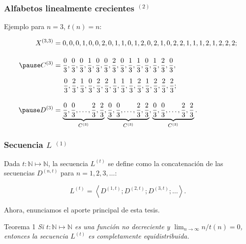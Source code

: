 \documentclass[t, 10pt, mathserif]{beamer}
\begin{document}
\begin{frame}
  \frametitle{Alfabetos linealmente crecientes {$^{(2)}$}}

  Ejemplo para $n = 3$, $t(n) = n$:
  \pause

  \begin{equation*}
    \begin{aligned}
      X^{(3, 3)} & = 0, 0, 0, 1, 0, 0, 2, 0, 1, 1, 0, 1, 2, 0, 2, 1, 0, 2, 2, 1, 1, 1, 2, 1, 2, 2, 2  \text{;} \\[0.4cm] \pause
      C^{(3)}    & = \frac{0}{3}, \frac{0}{3}, \frac{0}{3}, \frac{1}{3}, \frac{0}{3}, \frac{0}{3}, \frac{2}{3}, \frac{0}{3}, \frac{1}{3}, \frac{1}{3}, \frac{0}{3}, \frac{1}{3}, \frac{2}{3}, \frac{0}{3}, \\[0.2cm]
                 & \hspace{0.5cm} \frac{0}{3}, \frac{2}{3}, \frac{1}{3}, \frac{0}{3}, \frac{2}{3}, \frac{2}{3}, \frac{1}{3}, \frac{1}{3}, \frac{1}{3}, \frac{2}{3}, \frac{1}{3}, \frac{2}{3}, \frac{2}{3}, \frac{2}{3} \text{;} \\[0.4cm] \pause
      D^{(3)}   & = \underbrace{\frac{0}{3}, \frac{0}{3}, \dots, \frac{2}{3}, \frac{2}{3}}_{C^{(3)}}, \underbrace{\frac{0}{3}, \frac{0}{3}, \dots, \frac{2}{3}, \frac{2}{3}}_{C^{(3)}}, \underbrace{\frac{0}{3}, \frac{0}{3}, \dots, \frac{2}{3}, \frac{2}{3}}_{C^{(3)}} \text{.}
    \end{aligned}
  \end{equation*}
\end{frame}


\begin{frame}
  \frametitle{Secuencia $L$ {$^{(1)}$}}

  \begin{definition}
    \medskip
    Dada $t : \mathbb{N} \mapsto \mathbb{N}$, la secuencia $L^{(t)}$ se define como la concatenación de las secuencias $D^{(n, t)}$ para $n = 1, 2, 3, \dots$:
    \pause

    \begin{equation*}
      L^{(t)} = \left< D^{(1, t)} ; D^{(2, t)} ;  D^{(3, t)} ; \dots \right> \text{.}
    \end{equation*}
  \end{definition}
  \pause

  {\color{cyan} Ahora, enunciamos el aporte principal de esta tesis.}
  \pause

  \medskip
  \begin{block}{Teorema 1}
    \medskip
    \textit{Si $t : \mathbb{N} \mapsto \mathbb{N}$ es una función no decreciente y $\lim_{n \to \infty} n / t(n) = 0$, entonces la secuencia $L^{(t)}$ es completamente equidistribuida.}
  \end{block}
\end{frame}
\end{document}
